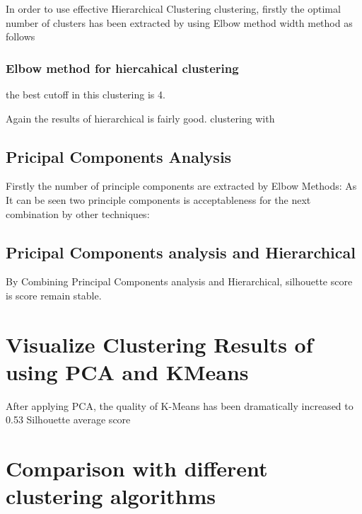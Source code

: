 \documentclass[
  11pt,
]{article}
\begin{document}
In order to use effective Hierarchical Clustering clustering, firstly
the optimal number of clusters has been extracted by using Elbow method
width method as follows

\hypertarget{elbow-method-for-hiercahical-clustering}{%
\subsubsection{Elbow method for hiercahical
clustering}\label{elbow-method-for-hiercahical-clustering}}

the best cutoff in this clustering is 4.

Again the results of hierarchical is fairly good. clustering with

\hypertarget{pricipal-components-analysis}{%
\subsection{Pricipal Components
Analysis}\label{pricipal-components-analysis}}

Firstly the number of principle components are extracted by Elbow
Methods: As It can be seen two principle components is acceptableness
for the next combination by other techniques:

\hypertarget{pricipal-components-analysis-and-hierarchical}{%
\subsection{Pricipal Components analysis and
Hierarchical}\label{pricipal-components-analysis-and-hierarchical}}

By Combining Principal Components analysis and Hierarchical, silhouette
score is score remain stable.

\hypertarget{visualize-clustering-results-of-using-pca-and-kmeans}{%
\section{Visualize Clustering Results of using PCA and
KMeans}\label{visualize-clustering-results-of-using-pca-and-kmeans}}

After applying PCA, the quality of K-Means has been dramatically
increased to 0.53 Silhouette average score

\hypertarget{comparison-with-different-clustering-algorithms}{%
\section{Comparison with different clustering
algorithms}\label{comparison-with-different-clustering-algorithms}}
\end{document}
